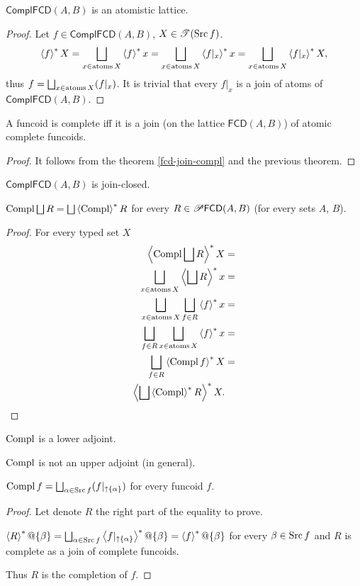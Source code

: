 \begin{thm}
$\mathsf{ComplFCD}(A,B)$ is an atomistic lattice.\end{thm}
\begin{proof}
Let $f\in\mathsf{ComplFCD}(A,B)$, $X\in\mathscr{T}(\operatorname{Src} f)$.
\[
\rsupfun fX=\bigsqcup_{x\in\atoms X}\rsupfun fx=\bigsqcup_{x\in\atoms
X}\rsupfun{f|_{x}}x=\bigsqcup_{x\in\atoms X}\rsupfun{f|_{x}}X,
\]
thus $f=\bigsqcup_{x\in\atoms X}(f|_{x})$. It is trivial that every
$f|_{x}$ is a join of atoms of $\mathsf{ComplFCD}(A,B)$.\end{proof}
\begin{thm}
A funcoid is complete iff it is a join (on the lattice $\mathsf{FCD}(A,B)$)
of atomic complete funcoids.\end{thm}
\begin{proof}
It follows from the theorem \ref{fcd-join-compl} and the previous
theorem.\end{proof}
\begin{cor}
$\mathsf{ComplFCD}(A,B)$ is join-closed.\end{cor}
\begin{thm}
$\Compl\bigsqcup R=\bigsqcup\rsupfun{\Compl}R$ for every
$R\in\mathscr{P}\mathsf{FCD}(A,B)$
(for every sets $A$, $B$).\end{thm}
\begin{proof}
For every typed set $X$
\begin{align*}
\rsupfun{\Compl\bigsqcup R}X & =\\
\bigsqcup_{x\in\atoms X}\rsupfun{\bigsqcup R}x & =\\
\bigsqcup_{x\in\atoms X}\bigsqcup_{f\in R}\rsupfun fx & =\\
\bigsqcup_{f\in R}\bigsqcup_{x\in\atoms X}\rsupfun fx & =\\
\bigsqcup_{f\in R}\rsupfun{\Compl f}X & =\\
\rsupfun{\bigsqcup\rsupfun{\Compl}R}X.
\end{align*}
\end{proof}
\begin{cor}
$\operatorname{Compl}$ is a lower adjoint.\end{cor}
\begin{conjecture}
$\operatorname{Compl}$ is not an upper adjoint (in general).\end{conjecture}
\begin{prop}
$\Compl f=\bigsqcup_{\alpha\in\Src f}(f|_{\uparrow\{\alpha\}})$
for every funcoid $f$.\end{prop}
\begin{proof}
Let denote $R$ the right part of the equality to prove.

$\rsupfun R@\{\beta\}=\bigsqcup_{\alpha\in\Src
f}\rsupfun{f|_{\uparrow\{\alpha\}}}@\{\beta\}=\rsupfun
f@\{\beta\}$
for every $\beta\in\operatorname{Src} f$ and $R$ is complete as a join of complete
funcoids.

Thus $R$ is the completion of $f$.\end{proof}
